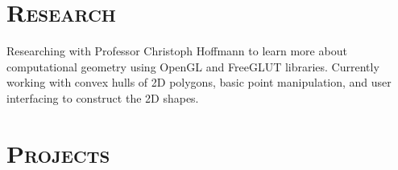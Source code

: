 \begin{resume}

\section{\textsc{Research}}



\begin{position}
    Researching with Professor Christoph Hoffmann to learn more about computational geometry using OpenGL and FreeGLUT libraries. Currently working with convex hulls of 2D polygons, basic point manipulation, and user interfacing to construct the 2D shapes.
\end{position}



\section{\textsc{Projects}}


\end{resume}

